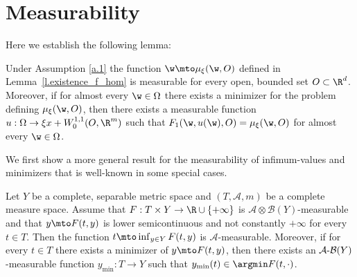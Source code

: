 \section{Measurability}\label{app:2}
Here we establish the following lemma:
\begin{lemma}\label{l.measurable}
Under Assumption \ref{a.1} the function $\w\mto \mu_{\xi}(\w,O)$ defined in Lem\-ma~\ref{l.existence_f_hom} is measurable for every open, bounded set $O\subset\R^d$. Moreover, if for almost every $\w\in\Omega$ there exists a minimizer for the problem defining $\mu_{\xi}(\w,O)$, then there exists a measurable function $u:\Omega\to \xi x+W^{1,1}_0(O,\R^m)$ such that $F_1(\w,u(\w),O)=\mu_{\xi}(\w,O)$ for almost every $\w\in\Omega$.
\end{lemma}
We first show a more general result for the measurability of infimum-values and minimizers that is well-known in some special cases.
\begin{lemma}\label{l.oninf}
Let $Y$ be a complete, separable metric space and $(T,\mathcal{A},m)$ be a complete measure space. Assume that $F:T\times Y\to \R\cup\{+\infty\}$ is $\mathcal{A}\otimes \mathcal{B}(Y)$-measurable and that $y\mto F(t,y)$ is lower semicontinuous and not constantly $+\infty$ for every $t\in T$. Then the function $t\mto\inf_{y\in Y} F(t,y)$ is $\mathcal{A}$-measurable. Moreover, if for every $t\in T$ there exists a minimizer of $y\mto F(t,y)$, then there exists an $\mathcal{A}\hbox{-}\mathcal{B}(Y)$-measurable function $y_\mathrm{min}:T\to Y$ such that $y_\mathrm{min}(t)\in\argmin F(t,\cdot)$.
\end{lemma}
